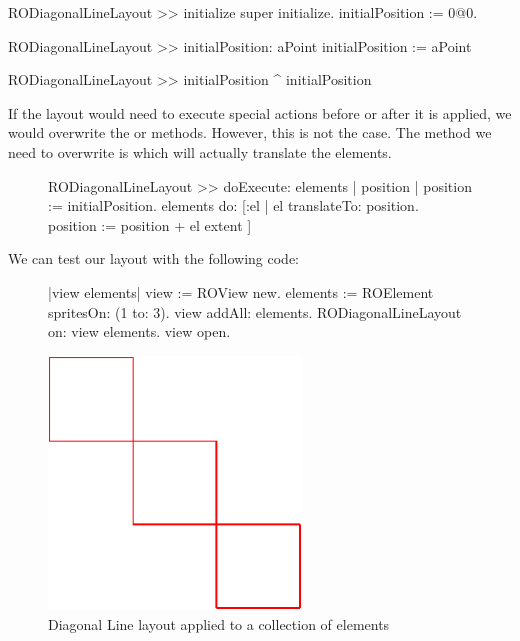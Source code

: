 \documentclass[a4paper,10pt,twoside]{book}
\begin{document}
\begin{code}{}
RODiagonalLineLayout >> initialize
	super initialize.
	initialPosition := 0@0.
	
RODiagonalLineLayout >> initialPosition: aPoint
	initialPosition := aPoint
	
RODiagonalLineLayout >> initialPosition
	^ initialPosition
\end{code}

If the layout would need to execute special actions before or after it is applied, we would overwrite the  or  methods. However, this is not the case. 
The method we need to overwrite is  which will actually translate the elements.

\begin{figure}[H]
\begin{code}{}
RODiagonalLineLayout >> doExecute: elements
	| position |	
	position := initialPosition.
	elements do: [:el | 
		el translateTo: position.
		position := position + el extent ] 
\end{code}
\end{figure}

We can test our layout with the following code:

\begin{figure}[H]
      \begin{minipage}[t]{0.61\textwidth}
      \vspace{0pt}
\begin{code}{}
|view elements|
view := ROView new.
elements := ROElement spritesOn: (1 to: 3).
view addAll: elements.
RODiagonalLineLayout on: view elements.
view open.
\end{code}
   \end{minipage}
   \hfill
   \begin{minipage}[t]{0.5\textwidth}
      \vspace{0pt}\raggedright
       \centering
		\includegraphics[width=0.6\textwidth]{diagonalLineLayout}
   \end{minipage}
\label{fig:diagonalLineLayout}
\caption{Diagonal Line layout applied to a collection of elements}
\end{figure} 
\end{document}
